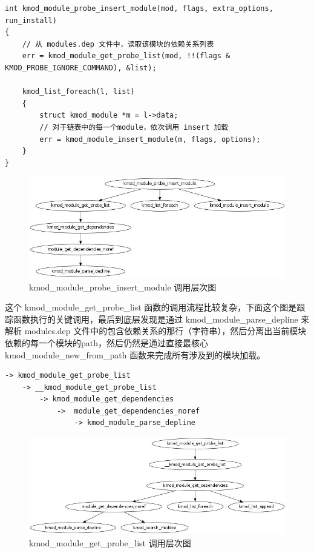 \documentclass[11pt,a4paper]{article}
\makeatletter
\def\maxwidth{\ifdim\Gin@nat@width>\linewidth\linewidth
\else\Gin@nat@width\fi}
\let\Oldincludegraphics\includegraphics
\renewcommand{\includegraphics}[1]{\Oldincludegraphics[width=\maxwidth]{#1}}
\makeatother
\begin{document}
{\begin{shaded}\begin{verbatim}
int kmod_module_probe_insert_module(mod, flags, extra_options, run_install)
{
    // 从 modules.dep 文件中，读取该模块的依赖关系列表       
    err = kmod_module_get_probe_list(mod, !!(flags & KMOD_PROBE_IGNORE_COMMAND), &list);

    kmod_list_foreach(l, list) 
    {
        struct kmod_module *m = l->data;
        // 对于链表中的每一个module，依次调用 insert 加载
        err = kmod_module_insert_module(m, flags, options);
    }
}
\end{verbatim}\end{shaded}}
\begin{figure}[htbp]
\centering
\includegraphics{./figures/kmod_module_probe_insert_module.jpg}
\caption{kmod\_module\_probe\_insert\_module 调用层次图}
\end{figure}

这个 kmod\_module\_get\_probe\_list
函数的调用流程比较复杂，下面这个图是跟踪函数执行的关键调用，最后到底层发现是通过
kmod\_module\_parse\_depline 来解析 modules.dep
文件中的包含依赖关系的那行（字符串），然后分离出当前模块依赖的每一个模块的path，然后仍然是通过直接最核心
kmod\_module\_new\_from\_path 函数来完成所有涉及到的模块加载。

{\begin{shaded}\begin{verbatim}
-> kmod_module_get_probe_list
    -> __kmod_module_get_probe_list
        -> kmod_module_get_dependencies
            ->  module_get_dependencies_noref
                -> kmod_module_parse_depline
\end{verbatim}\end{shaded}}
\begin{figure}[htbp]
\centering
\includegraphics{./figures/kmod_module_get_probe_list.jpg}
\caption{kmod\_module\_get\_probe\_list 调用层次图}
\end{figure}
\end{document}
